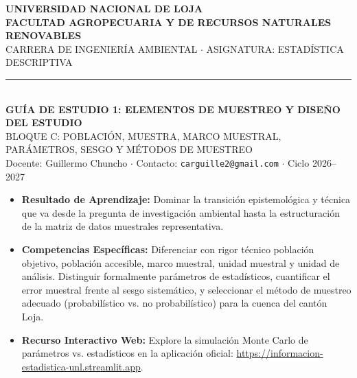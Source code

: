 \documentclass[11pt,a4paper]{article}
\begin{document}
\begin{bannerbox}
\centering
{\large\bfseries\color{white} UNIVERSIDAD NACIONAL DE LOJA}\\[2pt]
{\small\bfseries\color{white} FACULTAD AGROPECUARIA Y DE RECURSOS NATURALES RENOVABLES}\\[2pt]
{\footnotesize\color{white} CARRERA DE INGENIERÍA AMBIENTAL $\cdot$ ASIGNATURA: ESTADÍSTICA DESCRIPTIVA}\\[4pt]
\rule{\linewidth}{0.5pt}\\[4pt]
{\large\bfseries\color{white} GUÍA DE ESTUDIO 1: ELEMENTOS DE MUESTREO Y DISEÑO DEL ESTUDIO}\\[2pt]
{\footnotesize\color{white} BLOQUE C: POBLACIÓN, MUESTRA, MARCO MUESTRAL, PARÁMETROS, SESGO Y MÉTODOS DE MUESTREO}\\[2pt]
{\scriptsize\color{white} Docente: Guillermo Chuncho $\cdot$ Contacto: \texttt{carguille2@gmail.com} $\cdot$ Ciclo 2026--2027}
\end{bannerbox}

\vspace{0.3cm}

\begin{objetivobox}
\begin{itemize}[leftmargin=*,noitemsep]
  \item \textbf{Resultado de Aprendizaje:} Dominar la transición epistemológica y técnica que va desde la pregunta de investigación ambiental hasta la estructuración de la matriz de datos muestrales representativa.
  \item \textbf{Competencias Específicas:} Diferenciar con rigor técnico población objetivo, población accesible, marco muestral, unidad muestral y unidad de análisis. Distinguir formalmente parámetros de estadísticos, cuantificar el error muestral frente al sesgo sistemático, y seleccionar el método de muestreo adecuado (probabilístico vs. no probabilístico) para la cuenca del cantón Loja.
  \item \textbf{Recurso Interactivo Web:} Explore la simulación Monte Carlo de parámetros vs. estadísticos en la aplicación oficial: \url{https://informacion-estadistica-unl.streamlit.app}.
\end{itemize}
\end{objetivobox}

\vspace{0.2cm}
\end{document}
